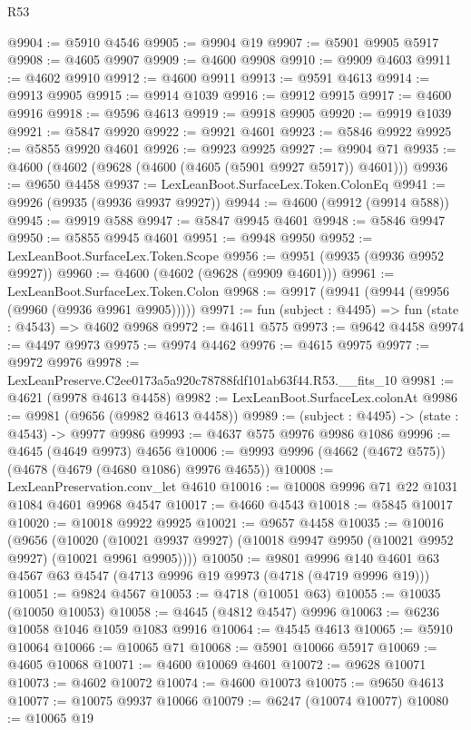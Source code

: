 \begin{lexlean}{R53}
\begin{coremodule}
@9904 := @5910 @4546
@9905 := @9904 @19
@9907 := @5901 @9905 @5917
@9908 := @4605 @9907
@9909 := @4600 @9908
@9910 := @9909 @4603
@9911 := @4602 @9910
@9912 := @4600 @9911
@9913 := @9591 @4613
@9914 := @9913 @9905
@9915 := @9914 @1039
@9916 := @9912 @9915
@9917 := @4600 @9916
@9918 := @9596 @4613
@9919 := @9918 @9905
@9920 := @9919 @1039
@9921 := @5847 @9920
@9922 := @9921 @4601
@9923 := @5846 @9922
@9925 := @5855 @9920 @4601
@9926 := @9923 @9925
@9927 := @9904 @71
@9935 := @4600 (@4602 (@9628 (@4600 (@4605 (@5901 @9927 @5917)) @4601)))
@9936 := @9650 @4458
@9937 := LexLeanBoot.SurfaceLex.Token.ColonEq
@9941 := @9926 (@9935 (@9936 @9937 @9927))
@9944 := @4600 (@9912 (@9914 @588))
@9945 := @9919 @588
@9947 := @5847 @9945 @4601
@9948 := @5846 @9947
@9950 := @5855 @9945 @4601
@9951 := @9948 @9950
@9952 := LexLeanBoot.SurfaceLex.Token.Scope
@9956 := @9951 (@9935 (@9936 @9952 @9927))
@9960 := @4600 (@4602 (@9628 (@9909 @4601)))
@9961 := LexLeanBoot.SurfaceLex.Token.Colon
@9968 := @9917 (@9941 (@9944 (@9956 (@9960 (@9936 @9961 @9905)))))
@9971 := fun (subject : @4495) => fun (state : @4543) => @4602 @9968
@9972 := @4611 @575
@9973 := @9642 @4458
@9974 := @4497 @9973
@9975 := @9974 @4462
@9976 := @4615 @9975
@9977 := @9972 @9976
@9978 := LexLeanPreserve.C2ee0173a5a920c78788fdf101ab63f44.R53.__fits_10
@9981 := @4621 (@9978 @4613 @4458)
@9982 := LexLeanBoot.SurfaceLex.colonAt
@9986 := @9981 (@9656 (@9982 @4613 @4458))
@9989 := (subject : @4495) -> (state : @4543) -> @9977 @9986
@9993 := @4637 @575 @9976 @9986 @1086
@9996 := @4645 (@4649 @9973) @4656
@10006 := @9993 @9996 (@4662 (@4672 @575)) (@4678 (@4679 (@4680 @1086) @9976 @4655))
@10008 := LexLeanPreservation.conv_let @4610
@10016 := @10008 @9996 @71 @22 @1031 @1084 @4601 @9968 @4547
@10017 := @4660 @4543
@10018 := @5845 @10017
@10020 := @10018 @9922 @9925
@10021 := @9657 @4458
@10035 := @10016
    (@9656
      (@10020 (@10021 @9937 @9927) (@10018 @9947 @9950 (@10021 @9952 @9927) (@10021 @9961 @9905))))
@10050 := @9801
    @9996
    @140
    @4601
    @63
    @4567
    @63
    @4547
    (@4713 @9996 @19 @9973 (@4718 (@4719 @9996 @19)))
@10051 := @9824 @4567
@10053 := @4718 (@10051 @63)
@10055 := @10035 (@10050 @10053)
@10058 := @4645 (@4812 @4547) @9996
@10063 := @6236 @10058 @1046 @1059 @1083 @9916
@10064 := @4545 @4613
@10065 := @5910 @10064
@10066 := @10065 @71
@10068 := @5901 @10066 @5917
@10069 := @4605 @10068
@10071 := @4600 @10069 @4601
@10072 := @9628 @10071
@10073 := @4602 @10072
@10074 := @4600 @10073
@10075 := @9650 @4613
@10077 := @10075 @9937 @10066
@10079 := @6247 (@10074 @10077)
@10080 := @10065 @19

\end{coremodule}
\end{lexlean}
